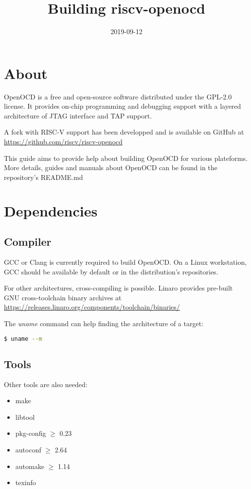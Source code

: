 \documentclass{article}
\title{Building riscv-openocd}
\date{2019-09-12}
\begin{document}
	\maketitle
    
    \section{About}
    
    OpenOCD is a free and open-source software distributed under the GPL-2.0 license. It provides on-chip programming and debugging support with a layered architecture of JTAG interface and TAP support.
    
    A fork with RISC-V support has been developped and is available on GitHub at \url{https://github.com/riscv/riscv-openocd}
    
    This guide aims to provide help about building OpenOCD for various plateforms. More details, guides and manuals about OpenOCD can be found in the repository's README.md
    
    \section{Dependencies}
    
    \subsection{Compiler}
    
    GCC or Clang is currently required to build OpenOCD. On a Linux workstation, GCC should be available by default or in the distribution's repositories.
    
    For other architectures, cross-compiling is possible. Linaro provides pre-built GNU cross-toolchain binary archives at \url{https://releases.linaro.org/components/toolchain/binaries/}
    
    The \textit{uname} command can help finding the architecture of a target:
    
    \begin{lstlisting}[language=bash]
    $ uname --m
    \end{lstlisting}
    
    \subsection{Tools}
    
    Other tools are also needed:
    \begin{itemize}
    	\itemsep0em
    	\item make
    	\item libtool
    	\item pkg-config $\geqslant$ 0.23
    	\item autoconf $\geqslant$ 2.64
    	\item automake $\geqslant$ 1.14
    	\item texinfo
    \end{itemize}
    
\end{document}
